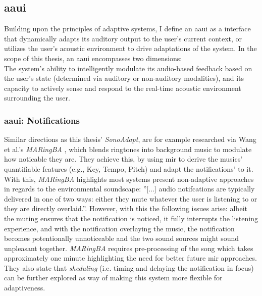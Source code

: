\subsection{\gls{aaui}}
Building upon the principles of adaptive systems, I define an \gls{aaui} as a interface that dynamically adapts its auditory output to the user's current context, or utilizes the user's acoustic environment to drive adaptations of the system.
In the scope of this thesis, an \gls{aaui} encompasses two dimensions:\\
The system's ability to intelligently modulate its audio-based feedback based on the user's state (determined via auditory or non-auditory modalities), and its capacity to actively sense and respond to the real-time acoustic environment surrounding the user.\\
\subsubsection{\gls{aaui}: Notifications}
Similar directions as this thesis' \textit{SonoAdapt}, are for example researched via Wang et al.'s \textit{MARingBA} \cite{Wang_24_Maringba}, which blends ringtones into background music to modulate how noticable they are. They achieve this, by using \gls{mir} to derive the musics' quantifiable features (e.g., Key, Tempo, Pitch) and adapt the notifications' to it. With this, \textit{MARingBA} highlights most systems present non-adaptive approaches in regards to the environmental soundscape: ''[...] audio notifcations are typically delivered in one of two ways: either they mute whatever the user is listening to or they are directly overlaid.''. However, with this the following issues arise: albeit the muting ensures that the notification is noticed, it fully interrupts the listening experience, and with the notification overlaying the music, the notification becomes potentionally unnoticeable and the two sound sources might sound unpleasant together. %
\textit{MARingBA} requires pre-processing of the song which takes approximately one minute highlighting the need for better future \gls{mir} approaches. %
They also state that \textit{sheduling} (i.e. timing and delaying the notification in focus) can be further explored as way of making this system more flexible for adaptiveness. %
